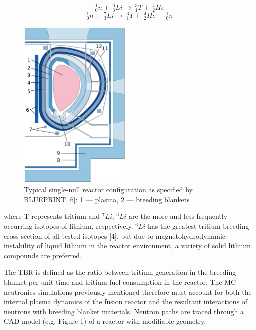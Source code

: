 \begin{equation}
    ^1_0n + \hspace{3pt} ^6_3Li \rightarrow \hspace{3pt} ^3_1T + \hspace{3pt} ^4_2He
\end{equation}
\begin{equation}
    ^1_0n + \hspace{3pt} ^7_3Li  \rightarrow \hspace{3pt} ^3_1T + \hspace{3pt} ^4_2He + \hspace{3pt} ^1_0n
\end{equation}
\begin{figure}
  \begin{center}
    \includegraphics[width=0.48\textwidth]{fig1_tokamakdiagram.png}
  \end{center}
  \caption{Typical single-null reactor configuration as specified by BLUEPRINT [6]: 1 — plasma,
2 — breeding blankets }
\end{figure}

where T represents tritium and $^7Li$, $^6Li$ are the more and less frequently occurring isotopes of lithium, respectively. $^6Li$ has the greatest tritium breeding cross-section of all tested isotopes [4], but due to magnetohydrodynamic instability of liquid lithium in the reactor environment, a variety of solid lithium compounds are preferred.

The TBR is defined as the ratio between tritium generation in the breeding blanket per unit time and tritium fuel consumption in the reactor. The MC neutronics simulations previously mentioned therefore must account for both the internal plasma dynamics of the fusion reactor and the resultant interactions of neutrons with breeding blanket materials. Neutron paths are traced through a CAD model (e.g. Figure 1) of a reactor with modifiable geometry.

